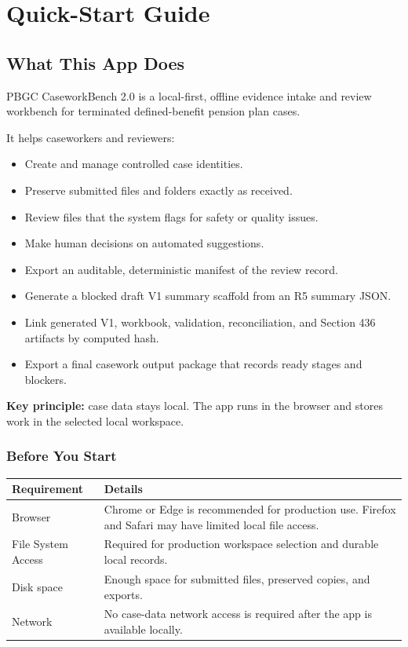 \part{Quick-Start Guide}

\chapter{What This App Does}

PBGC CaseworkBench 2.0 is a local-first, offline evidence intake and review workbench for terminated defined-benefit pension plan cases.

It helps caseworkers and reviewers:

\begin{itemize}
  \item Create and manage controlled case identities.
  \item Preserve submitted files and folders exactly as received.
  \item Review files that the system flags for safety or quality issues.
  \item Make human decisions on automated suggestions.
  \item Export an auditable, deterministic manifest of the review record.
  \item Generate a blocked draft V1 summary scaffold from an R5 summary JSON.
  \item Link generated V1, workbook, validation, reconciliation, and Section 436 artifacts by computed hash.
  \item Export a final casework output package that records ready stages and blockers.
\end{itemize}

\textbf{Key principle:} case data stays local. The app runs in the browser and stores work in the selected local workspace.

\section{Before You Start}

\begin{longtable}{L{0.28\textwidth}L{0.62\textwidth}}
\toprule
\textbf{Requirement} & \textbf{Details} \\
\midrule
Browser & Chrome or Edge is recommended for production use. Firefox and Safari may have limited local file access. \\
File System Access & Required for production workspace selection and durable local records. \\
Disk space & Enough space for submitted files, preserved copies, and exports. \\
Network & No case-data network access is required after the app is available locally. \\
\bottomrule
\end{longtable}


